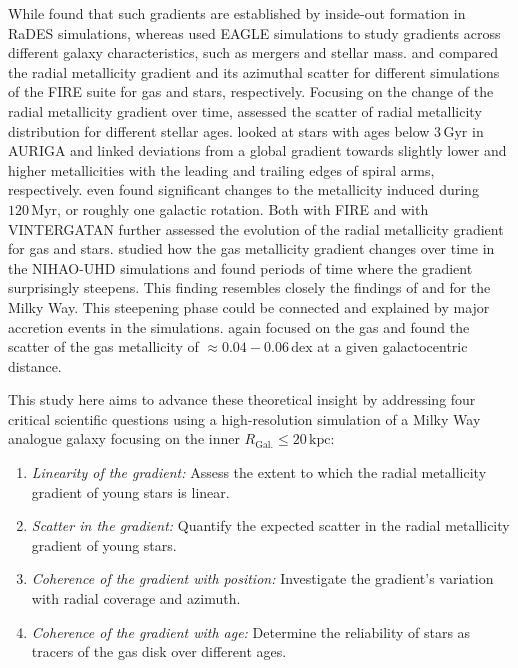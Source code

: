 \documentclass[fleqn,usenatbib]{mnras}
\begin{document}
While \citet{Pilkington2012} found that such gradients are established by inside-out formation in RaDES simulations, whereas \citet{Tissera2019} used EAGLE simulations to study gradients across different galaxy characteristics, such as mergers and stellar mass. \citet{Bellardini2021} and \citet{Bellardini2022, Graf2024} compared the radial metallicity gradient and its azimuthal scatter for different simulations of the FIRE suite for gas and stars, respectively. Focusing on the change of the radial metallicity gradient over time, \citet{Grand2015} assessed the scatter of radial metallicity distribution for different stellar ages. \citet{Grand2016} looked at stars with ages below $3\,\mathrm{Gyr}$ in AURIGA and linked deviations from a global gradient towards slightly lower and higher metallicities with the leading and trailing edges of spiral arms, respectively. \citet{Grand2016} even found significant changes to the metallicity induced during $120\,\mathrm{Myr}$, or roughly one galactic rotation. Both \citet[][see their Fig. 6]{Ma2017} with FIRE and \citet[see their Fig. 9][]{Agertz2021} with VINTERGATAN further assessed the evolution of the radial metallicity gradient for gas and stars. \citet{Buck2023} studied how the gas metallicity gradient changes over time in the NIHAO-UHD simulations and found periods of time where the gradient surprisingly steepens. This finding resembles closely the findings of \citet{Lu2022} and \citet{Ratcliffe2023} for the Milky Way. This steepening phase could be connected and explained by major accretion events in the simulations. \citet{Khoperskov2023e} again focused on the gas and found the scatter of the gas metallicity of $\approx 0.04-0.06\,\mathrm{dex}$ at a given galactocentric distance.

This study here aims to advance these theoretical insight by addressing four critical scientific questions using a high-resolution simulation of a Milky Way analogue galaxy focusing on the inner $R_\mathrm{Gal.} \leq 20\,\mathrm{kpc}$:
\begin{enumerate}
\item \textit{Linearity of the gradient:} Assess the extent to which the radial metallicity gradient of young stars is linear.
\item \textit{Scatter in the gradient:} Quantify the expected scatter in the radial metallicity gradient of young stars.
\item \textit{Coherence of the gradient with position:} Investigate the gradient's variation with radial coverage and azimuth.
\item \textit{Coherence of the gradient with age:} Determine the reliability of stars as tracers of the gas disk over different ages.
\end{enumerate}
\end{document}
